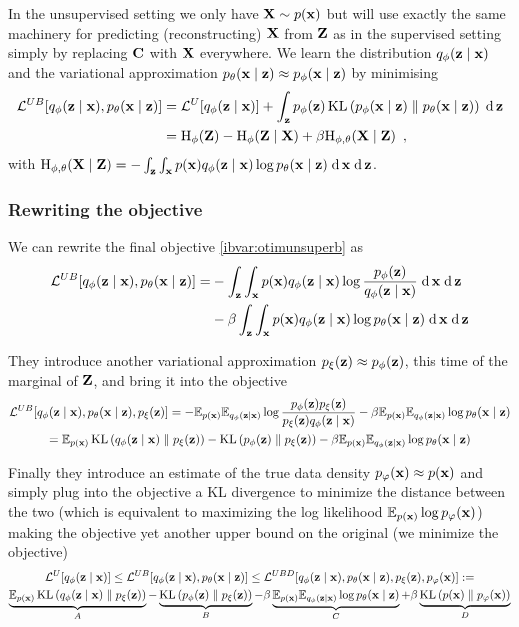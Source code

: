 \begin{notebox}
\tldr In the unsupervised setting we only have $\bX \sim p(\bx)$ but will use exactly the same machinery for predicting (reconstructing) $\bX$ from $\bZ$ as in the supervised setting simply by replacing $\bC$ with $\bX$ everywhere.
We learn the distribution $\qfz$ and the variational approximation $\ptx \approx p_\phi(\bx \mid \bz)$ by minimising
\begin{align}
\mL^{UB}[\qfz, \ptx] & = \mL^U[\qfz] + \int_\bz p_\phi(\bz) \KL{p_\phi(\bx \mid \bz)}{\ptx} \dif \bz \nn
& = \rH_\phi(\bZ) - \rH_\phi(\bZ \mid \bX) + \beta \rH_{\phi, \theta}(\bX \mid \bZ) \nonumber \enspace ,
\end{align}
with $\rH_{\phi, \theta}(\bX \mid \bZ)
= - \int_\bz \int_\bx p(\bx) \qfz \log \ptx \dif \bx \dif \bz$.
\end{notebox}

\subsubsection{Rewriting the objective}

We can rewrite the final objective \ref{ibvar:otimunsuperb} as
\begin{align}
\mL^{UB}[\qfz, \ptx] = &
- \int_\bz \int_\bx p(\bx) \qfz \log \frac{p_\phi(\bz)}{\qfz} \dif \bx \dif \bz \nn
& - \beta \int_\bz \int_\bx p(\bx) \qfz \log \ptx \dif \bx \dif \bz
\end{align}

They introduce another variational approximation $\pxz \approx p_\phi(\bz)$, this time of the marginal of $\bZ$, and bring it into the objective
\begin{gather}
\mL^{UB}[\qfz, \ptx, \pxz] = 
- \mE_{p(\bx)} \mE_{\qfz} \log \frac{p_\phi(\bz) \pxz}{\pxz \qfz}
- \beta \mE_{p(\bx)} \mE_{\qfz} \log \ptx \nn
= 
\mE_{p(\bx)} \KL{\qfz}{\pxz} - \KL{p_\phi(\bz)}{\pxz}
- \beta \mE_{p(\bx)} \mE_{\qfz} \log \ptx \nonumber
\end{gather}

Finally they introduce an estimate of the true data density $p_\varphi(\bx) \approx p(\bx)$ and simply plug into the objective a KL divergence to minimize the distance between the two (which is equivalent to maximizing the log likelihood $\mE_{p(\bx)}\log p_\varphi(\bx)$) making the objective yet another upper bound on the original (we minimize the objective)
\begin{gather}
\mL^{U}[\qfz] \leq \mL^{UB}[\qfz, \ptx] \leq \mL^{UBD}[\qfz, \ptx, \pxz, p_\varphi(\bx)] := \nn
\underbrace{\mE_{p(\bx)} \KL{\qfz}{\pxz}}_A - \underbrace{\KL{p_\phi(\bz)}{\pxz}}_B
- \beta \underbrace{\mE_{p(\bx)} \mE_{\qfz} \log \ptx}_C 
+ \beta \underbrace{\KL{p(\bx)}{p_\varphi(\bx)}}_D
\nonumber
\end{gather}

